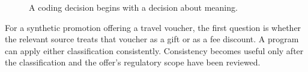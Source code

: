 \begin{figure}[H]
\centering
{}
\caption{A coding decision begins with a decision about meaning.}\label{fig:teach-M01-00}
\end{figure}

For a synthetic promotion offering a travel voucher, the first question is whether the relevant source treats that voucher as a gift or as a fee discount. A program can apply either classification consistently. Consistency becomes useful only after the classification and the offer's regulatory scope have been reviewed.

